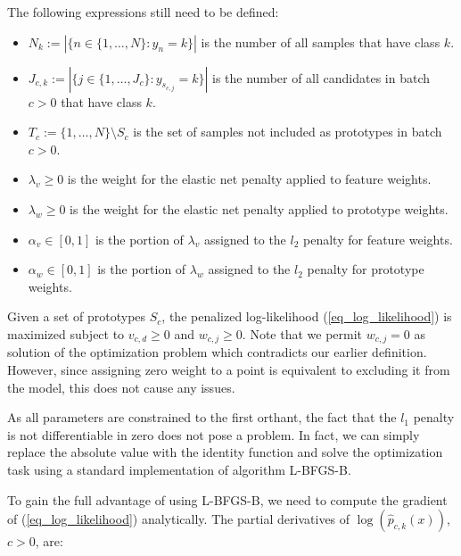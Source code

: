 %
The following expressions still need to be defined:
%
\begin{itemize}
\item $N_k:=\left|\{n\in\{1,\dots,N\}:y_n=k\}\right|$ is the number of all samples that have class $k$.
%
\item $J_{c,k}:=\left|\{j\in\{1,\dots,J_c\}:y_{s_{c,j}}=k\}\right|$
is the number of all candidates in batch $c>0$ that have class $k$.
%
\item $T_c:=\{1,\dots,N\}\setminus S_c$ is the set of samples not included as prototypes in batch $c>0$.
%
\item $\lambda_v\geq0$ is the weight for the elastic net penalty applied to feature weights.
%
\item $\lambda_w\geq0$ is the weight for the elastic net penalty applied to prototype weights.
%
\item $\alpha_v\in[0,1]$ is the portion of $\lambda_v$ assigned to the $l_2$ penalty for feature weights.
%
\item $\alpha_w\in[0,1]$ is the portion of $\lambda_w$ assigned to the $l_2$ penalty for prototype weights.
\end{itemize}
%
Given a set of prototypes $S_c$, the penalized log-likelihood (\ref{eq_log_likelihood}) is maximized subject to $v_{c,d}\geq0$ and $w_{c,j}\geq0$.
Note that we permit $w_{c,j}=0$ as solution of the optimization problem which contradicts our earlier definition.
However, since assigning zero weight to a point is equivalent to excluding it from the model, this does not cause any issues.\par
%
As all parameters are constrained to the first orthant, the fact that the $l_1$ penalty is not differentiable in zero does not pose a problem.
In fact, we can simply replace the absolute value with the identity function and solve the optimization task using a standard implementation of algorithm L-BFGS-B.\par
%
To gain the full advantage of using L-BFGS-B, we need to compute the gradient of (\ref{eq_log_likelihood}) analytically.
The partial derivatives of $\log(\hat{p}_{c,k}(x))$, $c>0$, are:
%
